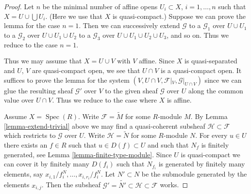 \documentclass[10pt,a4paper]{amsart}
\theoremstyle{plain}
\theoremstyle{definition}
\theoremstyle{remark}
\numberwithin{equation}{subsection}
\def\Spec{\mathop{\mathrm{Spec}}}
\begin{document}
\begin{proof}
Let $n$ be the minimal number of affine opens $U_i \subset X$,
$i = 1, \ldots , n$ such that $X = U \cup \bigcup U_i$.
(Here we use that $X$ is quasi-compact.) Suppose
we can prove the lemma for the case $n = 1$. Then we can successively
extend $\mathcal{G}$
to a $\mathcal{G}_1$ over $U \cup U_1$
to a $\mathcal{G}_2$ over $U \cup U_1 \cup U_2$
to a $\mathcal{G}_3$ over $U \cup U_1 \cup U_2 \cup U_3$,
and so on.
Thus we reduce to the case $n = 1$.

\medskip\noindent
Thus we may assume that $X = U \cup V$ with $V$ affine.
Since $X$ is quasi-separated and $U$, $V$ are quasi-compact open,
we see that $U \cap V$ is a quasi-compact open. It suffices to prove the
lemma for the system $(V, U \cap V, \mathcal{F}|_V, \mathcal{G}|_{U \cap V})$
since we can glue the resulting sheaf $\mathcal{G}'$ over $V$
to the given sheaf $\mathcal{G}$ over $U$ along the common value
over $U \cap V$.
Thus we reduce to the case where $X$ is affine.

\medskip\noindent
Assume $X = \Spec(R)$. Write $\mathcal{F} = \widetilde M$
for some $R$-module $M$. By Lemma \ref{lemma-extend-trivial} above we may
find a quasi-coherent subsheaf $\mathcal{H} \subset \mathcal{F}$
which restricts to $\mathcal{G}$ over $U$.
Write $\mathcal{H} = \widetilde N$ for some $R$-module $N$.
For every $u \in U$ there exists an $f \in R$ such that
$u \in D(f) \subset U$ and such that $N_f$ is finitely generated,
see Lemma \ref{lemma-finite-type-module}.
Since $U$ is quasi-compact we can cover it by finitely
many $D(f_i)$ such that $N_{f_i}$ is generated by
finitely many elements, say $x_{i, 1}/f_i^N, \ldots, x_{i, r_i}/f_i^N$.
Let $N' \subset N$ be the submodule generated by the elements
$x_{i, j}$. Then the subsheaf
$\mathcal{G}' = \widetilde{N'} \subset \mathcal{H} \subset \mathcal{F}$
works.
\end{proof}
\end{document}
